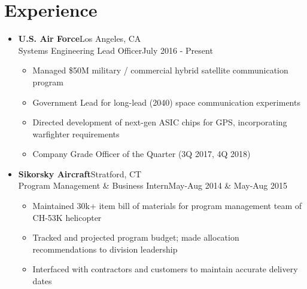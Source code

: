\documentclass{article}
\begin{document}

\section{Experience} 
\begin{itemize}
    \itemsep0.2em
    \item \textbf{U.S. Air Force}\hfill Los Angeles, CA\\Systems Engineering Lead Officer\hfill July 2016 - Present
    \vspace{-\topsep} \vspace{0.2em}
    \begin{itemize}
        \itemsep0em
        \item Managed \$50M military / commercial hybrid satellite communication program
        \item Government Lead for long-lead (2040) space communication experiments
        \item Directed development of next-gen ASIC chips for GPS, incorporating warfighter requirements
        \item Company Grade Officer of the Quarter (3Q 2017, 4Q 2018)
    \end{itemize}
    
    \item \textbf{Sikorsky Aircraft}\hfill Stratford, CT\\Program Management \& Business Intern\hfill May-Aug 2014 \& May-Aug 2015
    \vspace{-\topsep} \vspace{0.2em}
    \begin{itemize}
        \itemsep0em
        \item Maintained 30k+ item bill of materials for program management team of CH-53K helicopter
        \item Tracked and projected program budget; made allocation recommendations to division leadership
        \item Interfaced with contractors and customers to maintain accurate delivery dates
    \end{itemize}
    

\end{itemize}
\end{document}
